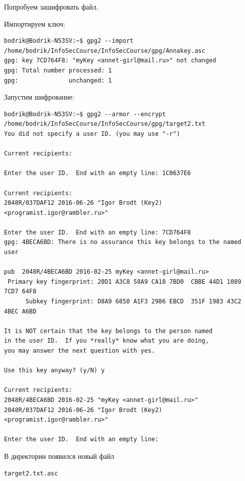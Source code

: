Попробуем зашифровать файл.

Импортируем ключ:

\begin{verbatim}  
bodrik@Bodrik-N53SV:~$ gpg2 --import /home/bodrik/InfoSecCourse/InfoSecCourse/gpg/Annakey.asc
gpg: key 7CD764F8: "myKey <annet-girl@mail.ru>" not changed
gpg: Total number processed: 1
gpg:              unchanged: 1
\end{verbatim}

Запустим шифрование:

\begin{verbatim}
bodrik@Bodrik-N53SV:~$ gpg2 --armor --encrypt /home/bodrik/InfoSecCourse/InfoSecCourse/gpg/target2.txt
You did not specify a user ID. (you may use "-r")

Current recipients:

Enter the user ID.  End with an empty line: 1C0637E6

Current recipients:
2048R/037DAF12 2016-06-26 "Igor Brodt (Key2) <programist.igor@rambler.ru>"

Enter the user ID.  End with an empty line: 7CD764F8
gpg: 4BECA6BD: There is no assurance this key belongs to the named user

pub  2048R/4BECA6BD 2016-02-25 myKey <annet-girl@mail.ru>
 Primary key fingerprint: 20D1 A3C8 58A9 CA18 7BD0  CBBE 44D1 1089 7CD7 64F8
      Subkey fingerprint: D8A9 6850 A1F3 2986 EBCD  351F 1983 43C2 4BEC A6BD

It is NOT certain that the key belongs to the person named
in the user ID.  If you *really* know what you are doing,
you may answer the next question with yes.

Use this key anyway? (y/N) y

Current recipients:
2048R/4BECA6BD 2016-02-25 "myKey <annet-girl@mail.ru>"
2048R/037DAF12 2016-06-26 "Igor Brodt (Key2) <programist.igor@rambler.ru>"

Enter the user ID.  End with an empty line: 

\end{verbatim}

В директории появился новый файл

\begin{verbatim}
target2.txt.asc
\end{verbatim}